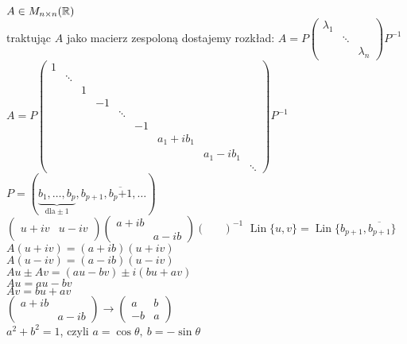 \begin{dd} ~\\ 
    $A \in M_{n \times n} (\mathbb{R})$ \\
    traktując $A$ jako macierz zespoloną dostajemy rozkład: 
    $A = P \begin{pmatrix} \lambda_1 & & \\ &\ddots& \\ & & \lambda_n \end{pmatrix}P^{-1}$
    \\$A = P \begin{pmatrix} 1 & & & & & & & & \\ 
                           & \ddots & & & & & & & \\ 
                           & & 1 & & & & & & \\ 
                           & & & -1 & & & & & \\ 
                           & & & & \ddots & & & &  \\ 
                           & & & & & -1 & & & \\ 
                           & & & & & & a_1 + ib_1 & & \\ 
                           & & & & & & & a_1 - ib_1 &  \\
                           & & & & & & & & \ddots 
           \end{pmatrix} P^{-1}$ \\ 
           $P=(\underbrace{b_1,\ldots,b_p}_{\text{dla} \pm 1},b_{p+1},\overline{b_p{+1}},\ldots)$ \\ 
        $\begin{pmatrix} & \\ u+iv & u - iv \\ & \end{pmatrix} 
        \begin{pmatrix} a + ib & \\ & a - ib \end{pmatrix} \begin{pmatrix} & \\ & 
    \end{pmatrix}^{-1}$ 
    $ \operatorname{Lin} \{u,v\} = \operatorname{Lin} \{b_{p+1}, \overline{b_{p+1}}\}$ \\ 
    $A (u+iv) = (a+ib)(u+iv)$ \\ 
    $A (u-iv) = (a-ib)(u-iv)$ \\ 
    $Au \pm Av = (au - bv) \pm i(bu+av)$ \\ 
    $Au = au - bv $ \\ 
    $Av = bu + av $ \\ 
    $\begin{pmatrix} a + ib & \\ & a - ib \end{pmatrix} 
    \to \begin{pmatrix} a & b \\ -b & a \end{pmatrix}$ \\ 
    $a^2 + b^2 = 1$, czyli $a = \cos \theta,\ b = -\sin\theta$
\end{dd} 
